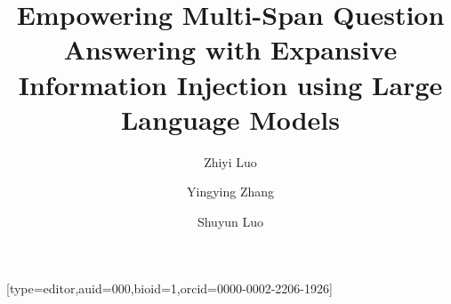 \documentclass[a4paper,fleqn]{cas-dc}
\newcommand{\1}[1]{\mathds{1}\left[#1\right]}
\begin{document}
\let\WriteBookmarks\relax
\def\floatpagepagefraction{1}
\def\textpagefraction{.001}



\title{Empowering Multi-Span Question Answering with Expansive Information Injection using Large Language Models}  

\author{Zhiyi Luo}[type=editor,auid=000,bioid=1,orcid=0000-0002-2206-1926]

\author{Yingying Zhang}

\author{Shuyun Luo}
\cormark[1]

\address[mymainaddress]{School of Computer Science and Technology and the Key Laboratory of Intelligent Textile and Flexible Interconnection of Zhejiang Province, Zhejiang Sci-Tech University}
\address[mysecondaryaddress]{No. 928, No. 2 street, Baiyang street, Qiantang New District, Hangzhou 310018, China}


%
%
%
%
%
%
%
%
%
\end{document}

